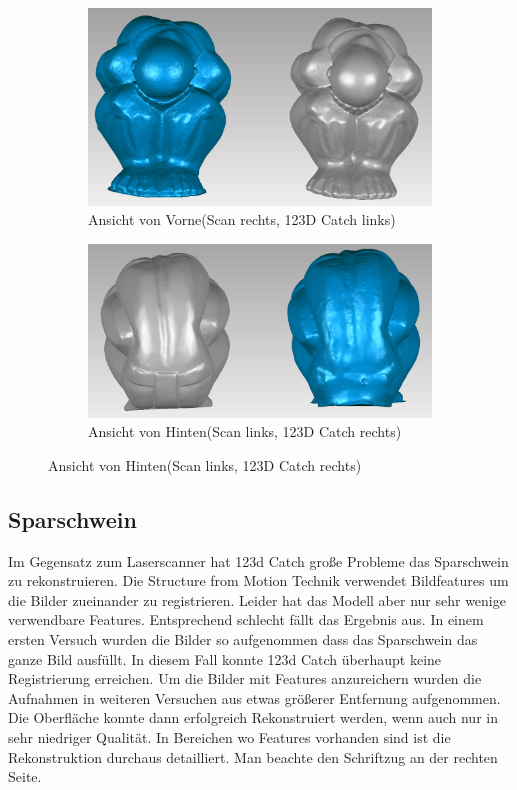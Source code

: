 \documentclass[]{article}
\begin{document}
\begin{figure}[hbtp]
\caption{Vergleich Scan vs 123D Catch}

\begin{subfigure}{\textwidth}
	\caption{Ansicht von Vorne(Scan rechts, 123D Catch links)}
	\centering
	\includegraphics[width=\textwidth]{images/Mann_20_Comparison_Front.PNG}
\end{subfigure}

\begin{subfigure}{\textwidth}
	\caption{Ansicht von Hinten(Scan links, 123D Catch rechts)}
	\centering
	\includegraphics[width=\textwidth]{images/Mann_19_Comparison_Back.PNG}
\end{subfigure}

\end{figure}

\subsection{Sparschwein}
Im Gegensatz zum Laserscanner hat 123d Catch große Probleme das Sparschwein zu rekonstruieren. Die Structure from Motion Technik verwendet Bildfeatures um die Bilder zueinander zu registrieren. Leider hat das Modell aber nur sehr wenige verwendbare Features. Entsprechend schlecht fällt das Ergebnis aus. In einem ersten Versuch wurden die Bilder so aufgenommen dass das Sparschwein das ganze Bild ausfüllt. In diesem Fall konnte 123d Catch überhaupt keine Registrierung erreichen. Um die Bilder mit Features anzureichern wurden die Aufnahmen in weiteren Versuchen aus etwas größerer Entfernung aufgenommen. Die Oberfläche konnte dann erfolgreich Rekonstruiert werden, wenn auch nur in sehr niedriger Qualität. In Bereichen wo Features vorhanden sind ist die Rekonstruktion durchaus detailliert. Man beachte den Schriftzug an der rechten Seite.
\end{document}
